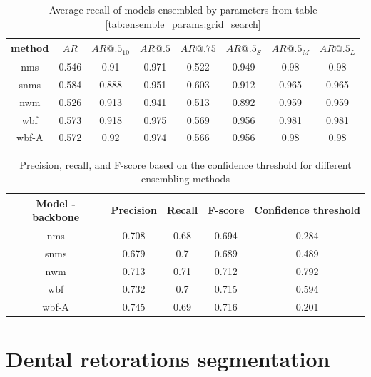 \begin{table}[h]
    \centering
    \begin{tabular}{|c|c|c|c|c|c|c|c|}
        \hline
        method & $AR$  & $AR@.5_{10}$ & $AR@.5$ & $AR@.75$ & $AR@.5_S$ & $AR@.5_M$ & $AR@.5_L$ \\ \hline
        nms    & 0.546 & 0.91         & 0.971   & 0.522    & 0.949     & 0.98      & 0.98      \\ \hline
        snms   & 0.584 & 0.888        & 0.951   & 0.603    & 0.912     & 0.965     & 0.965     \\ \hline
        nwm    & 0.526 & 0.913        & 0.941   & 0.513    & 0.892     & 0.959     & 0.959     \\ \hline
        wbf    & 0.573 & 0.918        & 0.975   & 0.569    & 0.956     & 0.981     & 0.981     \\ \hline
        wbf-A  & 0.572 & 0.92         & 0.974   & 0.566    & 0.956     & 0.98      & 0.98      \\ \hline
    \end{tabular}
    \caption{Average recall of models ensembled by parameters from table \ref{tab:ensemble_params:grid_search}}
    \label{tab:recall:grid_search}
\end{table}


\begin{table}[h]
    \begin{tabular}{|c|c|c|c|c|}
        \hline
        Model - backbone & Precision & Recall & F-score & Confidence threshold \\ \hline
        nms              & 0.708     & 0.68   & 0.694   & 0.284                \\ \hline
        snms             & 0.679     & 0.7    & 0.689   & 0.489                \\ \hline
        nwm              & 0.713     & 0.71   & 0.712   & 0.792                \\ \hline
        wbf              & 0.732     & 0.7    & 0.715   & 0.594                \\ \hline
        wbf-A            & 0.745     & 0.69   & 0.716   & 0.201                \\ \hline
    \end{tabular}
    \caption{Precision, recall, and F-score based on the confidence threshold for different ensembling methods}
    \label{tab:ensembling_prf:grid_search}
\end{table}


\section{Dental retorations segmentation}
